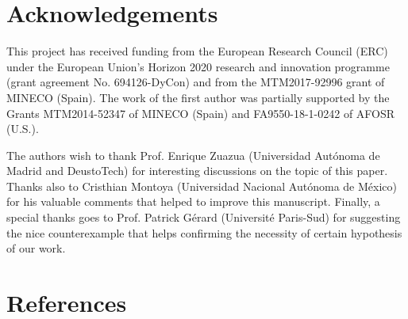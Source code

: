 \documentclass[preprint,1p]{elsarticle}
\begin{document}
\section*{Acknowledgements} 
This project has received funding from the European Research Council (ERC) under the European Union's Horizon 2020 research and innovation programme (grant agreement No. 694126-DyCon) and from the MTM2017-92996 grant of MINECO (Spain). The work of the first author was partially supported by the Grants MTM2014-52347 of MINECO (Spain) and FA9550-18-1-0242 of AFOSR (U.S.). 

The authors wish to thank Prof. Enrique Zuazua (Universidad Aut\'onoma de Madrid and DeustoTech) for interesting discussions on the topic of this paper. Thanks also to Cristhian Montoya (Universidad Nacional Aut\'onoma de M\'exico) for his valuable comments that helped to improve this manuscript. Finally, a special thanks goes to Prof. Patrick G\'erard (Universit\'e Paris-Sud) for suggesting the nice counterexample that helps confirming the necessity of certain hypothesis of our work.

\section*{References}


\end{document}
